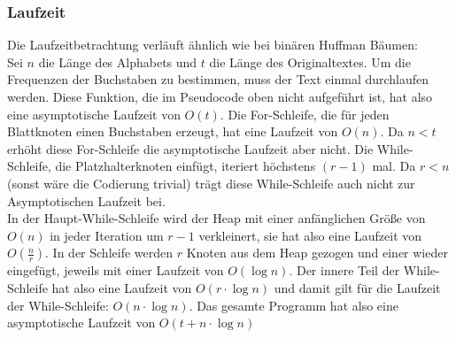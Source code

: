 \documentclass[a4paper,10pt,ngerman]{scrartcl}
\begin{document}
    \subsubsection{Laufzeit}
    Die Laufzeitbetrachtung verläuft ähnlich wie bei binären Huffman Bäumen\autocite{noauthor_huffman-kodierung_2025}:\\
    Sei $n$ die Länge des Alphabets und $t$ die Länge des Originaltextes.
    Um die Frequenzen der Buchstaben zu bestimmen, muss der Text einmal durchlaufen werden.
    Diese Funktion, die im Pseudocode oben nicht aufgeführt ist, hat also eine asymptotische Laufzeit von $O(t)$.
    Die For-Schleife, die für jeden Blattknoten einen Buchstaben erzeugt, hat eine Laufzeit von $O(n)$. Da $n < t$ erhöht diese For-Schleife die asymptotische Laufzeit aber nicht.
    Die While-Schleife, die Platzhalterknoten einfügt, iteriert höchstens $(r-1)$ mal. Da $r < n$ (sonst wäre die Codierung trivial) trägt diese While-Schleife auch nicht zur Asymptotischen Laufzeit bei.\\
    In der Haupt-While-Schleife wird der Heap mit einer anfänglichen Größe von $O(n)$ in jeder Iteration um $r-1$ verkleinert, sie hat also eine Laufzeit von $O(\frac n r)$.
    In der Schleife werden $r$ Knoten aus dem Heap gezogen und einer wieder eingefügt, jeweils mit einer Laufzeit von $O(\log n)$.
    Der innere Teil der While-Schleife hat also eine Laufzeit von $O(r \cdot \log n)$ und damit gilt für die Laufzeit der While-Schleife: $O(n \cdot \log n)$.
    Das gesamte Programm hat also eine asymptotische Laufzeit von $O(t + n \cdot \log n)$
\end{document}
